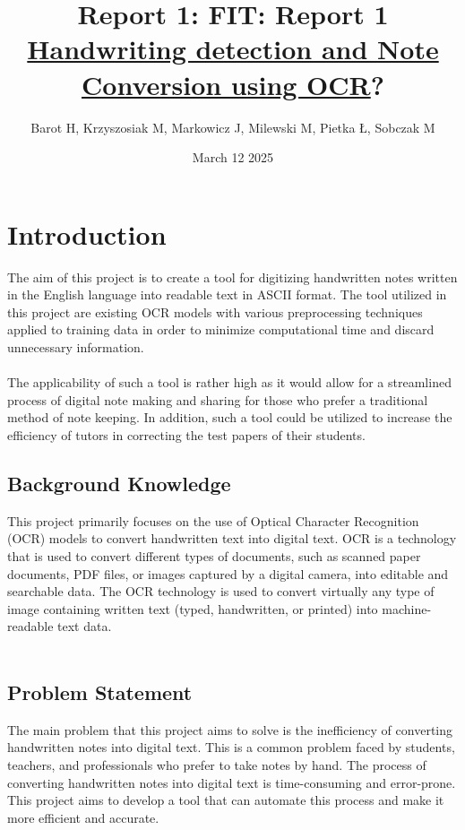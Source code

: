 \documentclass[twoside,a4paper]{article}
\title{Report 1: }
\title{\textbf{FIT: Report 1} \\[1ex] \Large \underline{Handwriting detection and Note Conversion using OCR}?
}
\author{Barot H, Krzyszosiak M, Markowicz J, Milewski M, Pietka Ł, Sobczak M}
\date{March 12 2025}
\begin{document}
\maketitle
\tableofcontents
\section{Introduction}
The aim of this project is to create a tool for digitizing handwritten notes written in the English language into readable text in ASCII format. The tool utilized in this project are existing OCR models with various preprocessing techniques applied to training data in order to minimize computational time and discard unnecessary information. \\\\
The applicability of such a tool is rather high as it would allow for a streamlined process of digital note making and sharing for those who prefer a traditional method of note keeping. In addition, such a tool could be utilized to increase the efficiency of tutors in correcting the test papers of their students.

\subsection{Background Knowledge}
This project primarily focuses on the use of Optical Character Recognition (OCR) models to convert handwritten text into digital text. 
OCR is a technology that is used to convert different types of documents, such as scanned paper documents, PDF files, or images captured by a digital camera, into editable and searchable data. The OCR technology is used to convert virtually any type of image containing written text (typed, handwritten, or printed) into machine-readable text data. \\\

\subsection{Problem Statement}
The main problem that this project aims to solve is the inefficiency of converting handwritten notes into digital text. 
This is a common problem faced by students, teachers, and professionals who prefer to take notes by hand. 
The process of converting handwritten notes into digital text is time-consuming and error-prone. 
This project aims to develop a tool that can automate this process and make it more efficient and accurate. \\\
 
\end{document}
